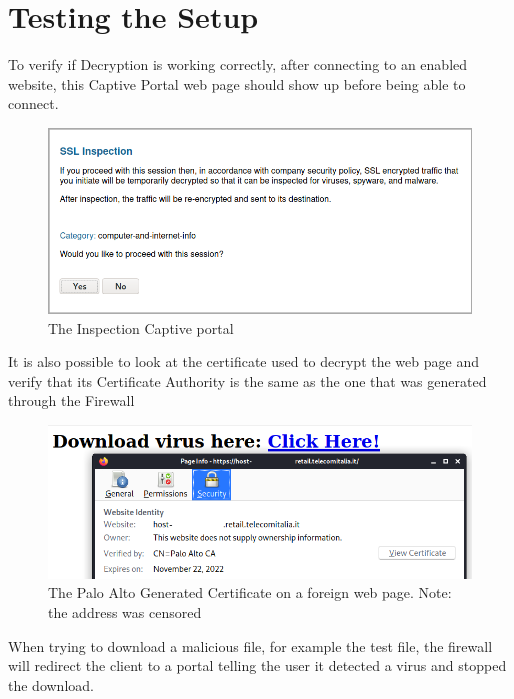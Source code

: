 \section{Testing the Setup}

To verify if  Decryption is working correctly, after connecting to an  enabled website, this Captive Portal web page should show up before being able to connect.

\begin{figure}[!h]
\centering
 \includegraphics[width=13cm]{img/ssl_inspection_result.png}
	\caption{The  Inspection Captive portal }\label{SSL Inspection Page}
\end{figure}

It is also possible to look at the certificate used to decrypt the web page and verify that its Certificate Authority is the same as the one that was generated through the Firewall

\begin{figure}[h!]
 \centering
 \includegraphics[width=13cm]{img/pa_certificate.png}
 \caption{The Palo Alto Generated Certificate on a foreign web page.
 Note: the  address was censored}
 \label{fig: PaloAlto certificate}
\end{figure}


\newpage

When trying to download a malicious file, for example the  test file, the firewall will redirect the client to a portal telling the user it detected a virus and stopped the download.

